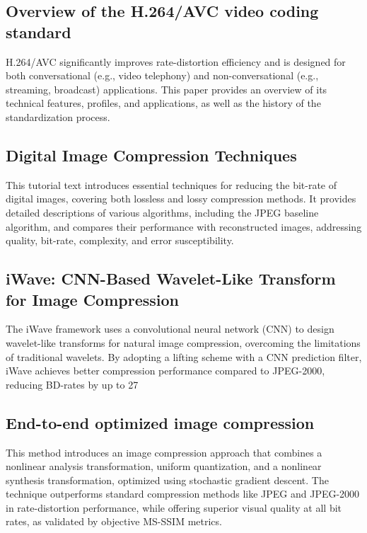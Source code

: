 \documentclass[conference]{IEEEtran}
\begin{document}
\subsection{Overview of the H.264/AVC video coding standard \cite{hf06005}} 
H.264/AVC significantly improves rate-distortion efficiency and is designed for both conversational (e.g., video telephony) and non-conversational (e.g., streaming, broadcast) applications. This paper provides an overview of its technical features, profiles, and applications, as well as the history of the standardization process.

\subsection{Digital Image Compression Techniques \cite{hf06006}} 
This tutorial text introduces essential techniques for reducing the bit-rate of digital images, covering both lossless and lossy compression methods. It provides detailed descriptions of various algorithms, including the JPEG baseline algorithm, and compares their performance with reconstructed images, addressing quality, bit-rate, complexity, and error susceptibility.

\subsection{iWave: CNN-Based Wavelet-Like Transform for Image Compression \cite{hf06007}} 
The iWave framework uses a convolutional neural network (CNN) to design wavelet-like transforms for natural image compression, overcoming the limitations of traditional wavelets. By adopting a lifting scheme with a CNN prediction filter, iWave achieves better compression performance compared to JPEG-2000, reducing BD-rates by up to 27%

\subsection{End-to-end optimized image compression \cite{hf06008}} 
This method introduces an image compression approach that combines a nonlinear analysis transformation, uniform quantization, and a nonlinear synthesis transformation, optimized using stochastic gradient descent. The technique outperforms standard compression methods like JPEG and JPEG-2000 in rate-distortion performance, while offering superior visual quality at all bit rates, as validated by objective MS-SSIM metrics.
\end{document}
